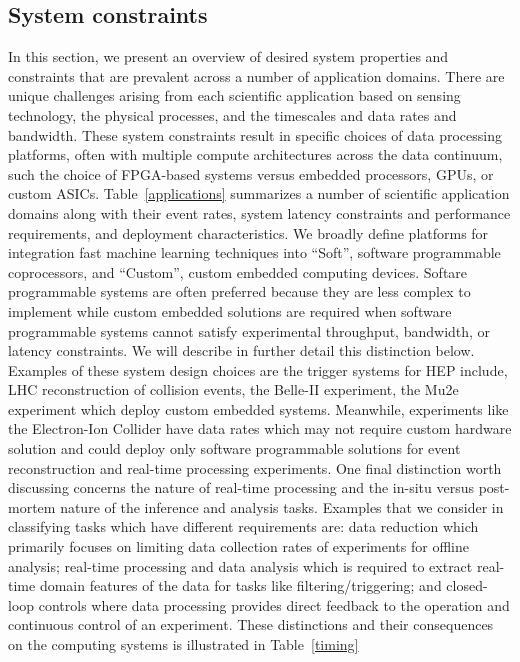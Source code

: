 \subsection{System constraints}
In this section, we present an overview of desired system properties and constraints that are prevalent across a number of application domains. There are unique challenges arising from each scientific application based on sensing technology, the physical processes, and the timescales and data rates and bandwidth.  These system constraints result in specific choices of data processing platforms, often with multiple compute architectures across the data continuum, such the choice of FPGA-based systems versus embedded processors, GPUs, or custom ASICs. Table~\ref{applications} summarizes a number of scientific application domains along with their event rates, system latency constraints and performance requirements, and deployment characteristics. We broadly define platforms for integration fast machine learning techniques into ``Soft'', software programmable coprocessors, and ``Custom'', custom embedded computing devices.  Softare programmable systems are often preferred because they are less complex to implement while custom embedded solutions are required when software programmable systems cannot satisfy experimental throughput, bandwidth, or latency constraints.  We will describe in further detail this distinction below.  
Examples of these system design choices are the trigger systems for HEP include, LHC reconstruction of collision events, the Belle-II experiment, the Mu2e experiment which deploy custom embedded systems. Meanwhile, experiments like the Electron-Ion Collider have data rates which may not require custom hardware solution and could deploy only software programmable solutions for event reconstruction and real-time processing experiments. %
One final distinction worth discussing concerns the nature of real-time processing and the in-situ versus post-mortem nature of the inference and analysis tasks. Examples that we consider in classifying tasks which have different requirements are: data reduction which primarily focuses on limiting data collection rates of experiments for offline analysis; real-time processing and data analysis which is required to extract real-time domain features of the data for tasks like filtering/triggering; and closed-loop controls where data processing provides direct feedback to the operation and continuous control of an experiment. These distinctions and their consequences on the computing systems is illustrated in Table~\ref{timing}  

